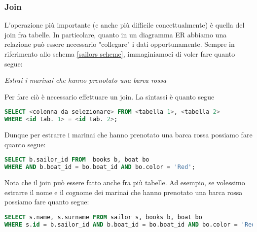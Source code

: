 \subsubsection{Join}
L'operazione più importante (e anche più difficile concettualmente) è quella del join fra tabelle. In particolare, quanto in un diagramma ER abbiamo una relazione può essere necessario "collegare" i dati opportunamente. Sempre in riferimento allo schema \ref{sailors scheme}, immaginiamoci di voler fare quanto segue:
\begin{center}
	\textit{Estrai i marinai che hanno prenotato una barca rossa}
\end{center}
Per fare ciò è necessario effettuare un join. La sintassi è quanto segue
\begin{lstlisting}[language = SQL, style = SQL, frame = none]
SELECT <colonna da selezionare> FROM <tabella 1>, <tabella 2>
WHERE <id tab. 1> = <id tab. 2>;
\end{lstlisting}
Dunque per estrarre i marinai che hanno prenotato una barca rossa possiamo fare quanto segue:

\begin{lstlisting}[language = SQL, style = SQL, frame = none]
SELECT b.sailor_id FROM  books b, boat bo
WHERE AND b.boat_id = bo.boat_id AND bo.color = 'Red';
\end{lstlisting}

Nota che il join può essere fatto anche fra più tabelle. Ad esempio, se volessimo estrarre il nome e il cognome dei marinai che hanno prenotato una barca rossa possiamo fare quanto segue:
\begin{lstlisting}[language = SQL, style = SQL, frame = none]
SELECT s.name, s.surname FROM sailor s, books b, boat bo
WHERE s.id = b.sailor_id AND b.boat_id = bo.boat_id AND bo.color = 'Red';
\end{lstlisting}

